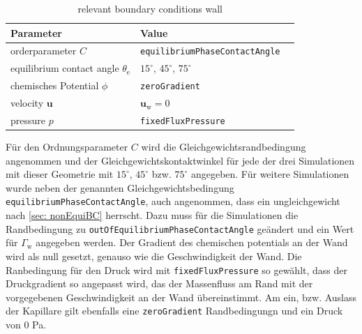 \begin{table}[h]
    \centering
        \caption{relevant boundary conditions wall}
        \label{tab: BoundaryConditions_wall}
        \begin{tabular}{lll}
            Parameter & Value \\ \hline
            orderparameter $C$ & \texttt{equilibriumPhaseContactAngle}     \\
            equilibrium contact angle $\theta_{\mathrm{e}}$ & $15^{\circ}$, $45^{\circ}$, $75^{\circ}$\\
            chemisches Potential $\phi$   & \texttt{zeroGradient}        \\ 
            velocity $\mathbf{u}$ &   $\mathbf{u_{\mathrm{w}}} = 0$\\
            pressure $p$&  \texttt{fixedFluxPressure} \\
        \end{tabular}
\end{table}
Für den Ordnungsparameter $C$ wird die Gleichgewichtsrandbedingung angenommen und der Gleichgewichtskontaktwinkel für jede der drei Simulationen mit dieser Geometrie mit $15^{\circ}$, $45^{\circ}$ bzw. $75^{\circ}$ angegeben. Für weitere Simulationen wurde neben der genannten Gleichgewichtsbedingung \texttt{equilibriumPhaseContactAngle}, auch angenommen, dass ein ungleichgewicht nach \ref{sec: nonEquiBC} herrscht. Dazu muss für die Simulationen die Randbedingung zu \texttt{outOfEquilibriumPhaseContactAngle} geändert und ein Wert für $\Gamma_{\mathrm{w}}$ angegeben werden. 
Der Gradient des chemischen potentials an der Wand wird als null gesetzt, genauso wie die Geschwindigkeit der Wand. Die Ranbedingung für den Druck wird mit \texttt{fixedFluxPressure} so gewählt, dass der Druckgradient so angepasst wird, das der Massenfluss am Rand mit der vorgegebenen Geschwindigkeit an der Wand übereinstimmt. 
Am ein, bzw. Auslass der Kapillare gilt ebenfalls eine \texttt{zeroGradient} Randbedingungn und ein Druck von $0$ Pa.

